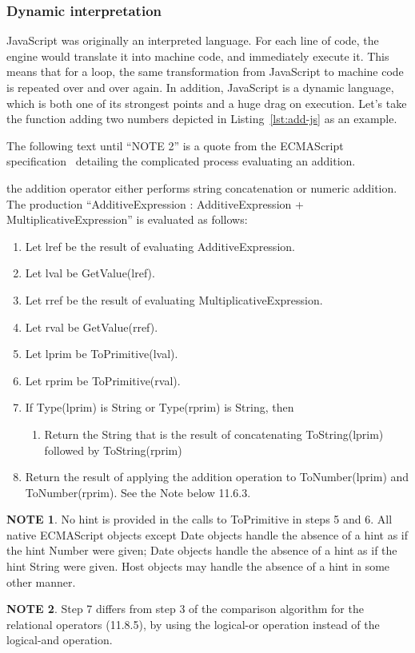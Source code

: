\subsubsection{Dynamic interpretation}%
\label{ssub:dynamic-interpretation}

JavaScript was originally an interpreted language.
For each line of code, the engine would translate it into machine code,
and immediately execute it.
This means that for a loop, the same transformation from JavaScript to machine code
is repeated over and over again.
In addition, JavaScript is a dynamic language, which is both one of its
strongest points and a huge drag on execution.
Let's take the function adding two numbers
depicted in Listing~\ref{lst:add-js} as an example.



The following text until ``NOTE 2'' is a quote from
the ECMAScript specification~\cite{ecmascript} detailing
the complicated process evaluating an addition.

\begin{displayquote}
the addition operator either performs string concatenation or numeric addition.
The production ``AdditiveExpression : AdditiveExpression + MultiplicativeExpression''
is evaluated as follows:

\begin{enumerate}
    \item Let lref be the result of evaluating AdditiveExpression.
    \item Let lval be GetValue(lref).
    \item Let rref be the result of evaluating MultiplicativeExpression.
    \item Let rval be GetValue(rref).
    \item Let lprim be ToPrimitive(lval).
    \item Let rprim be ToPrimitive(rval).
    \item If Type(lprim) is String or Type(rprim) is String, then
    \begin{enumerate}
        \item     Return the String that is the result of concatenating ToString(lprim) followed by ToString(rprim)
    \end{enumerate}
    \item Return the result of applying the addition operation to ToNumber(lprim) and ToNumber(rprim). See the Note below 11.6.3.
\end{enumerate}

\textbf{NOTE 1}. No hint is provided in the calls to ToPrimitive in steps 5 and 6. All native ECMAScript objects except Date objects handle the absence of a hint as if the hint Number were given; Date objects handle the absence of a hint as if the hint String were given. Host objects may handle the absence of a hint in some other manner.

\textbf{NOTE 2}. Step 7 differs from step 3 of the comparison algorithm for the relational operators (11.8.5), by using the logical-or operation instead of the logical-and operation.
\end{displayquote}


